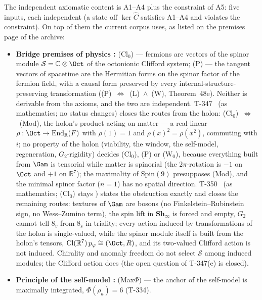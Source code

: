 The independent axiomatic content is A1--A4 plus the constraint of A5: five inputs,
each independent (a state off $\ker\hat C$ satisfies A1--A4 and violates the constraint).
On top of them the current corpus uses, as listed on the premises page of the archive:
\begin{itemize}[leftmargin=2em,nosep]
  \item \textbf{Bridge premises of physics :} (Cl$_0$) --- fermions are vectors
        of the spinor module $\mathcal S = \mathbb C\otimes\Oct$ of the octonionic Clifford
        system; (P) --- the tangent vectors of spacetime are the Hermitian forms on the
        spinor factor of the fermion field, with a causal form preserved by every
        internal-structure-preserving transformation ((P)~$\Leftrightarrow$~(L)~$\wedge$~(W),
        Theorem~48e). Neither is derivable from the axioms, and the two are independent.
        T-347~ (as mathematics; no status changes) closes the routes from the
        holon: (Cl$_0$)~$\Leftrightarrow$~(Mod), the holon's product acting on matter --- a
        real-linear $\rho:\Oct\to\mathrm{End}_{\mathbb R}(F)$ with $\rho(1) = 1$ and
        $\rho(x)^2 = \rho(x^2)$, commuting with $i$; no property of the holon (viability,
        the window, the self-model, regeneration, $G_2$-rigidity) decides (Cl$_0$), (P) or
        (W$_0$), because everything built from $\Gam$ is tensorial while matter is spinorial
        (the $2\pi$-rotation is $-1$ on $\Oct$ and $+1$ on $\mathbb{R}^7$); the maximality of
        $\mathrm{Spin}(9)$ presupposes (Mod), and the minimal spinor factor ($n = 1$) has no
        spatial direction. T-350~ (as mathematics; (Cl$_0$) stays ) states
        the obstruction exactly and closes the remaining routes: textures of $\Gam$ are bosons
        (no Finkelstein--Rubinstein sign, no Wess--Zumino term), the spin lift in
        $\mathbf{Sh}_\infty$ is forced and empty, $G_2$ cannot tell $8_v$ from $8_s$ in
        triality; every action induced by transformations of the holon is single-valued,
        while the spinor module itself is built from the holon's tensors,
        $\mathrm{Cl}(\mathbb{R}^7)\,p_\varphi \cong (\Oct, R)$, and its two-valued Clifford
        action is not induced. Chirality and anomaly freedom do not select $\mathcal S$ among
        induced modules; the Clifford action does (the open question of T-347(e) is closed).
  \item \textbf{Principle of the self-model :} (Max$\Phi$) --- the anchor of the
        self-model is maximally integrated, $\Phi(\rho_a) = 6$ (T-334).

\end{itemize}

